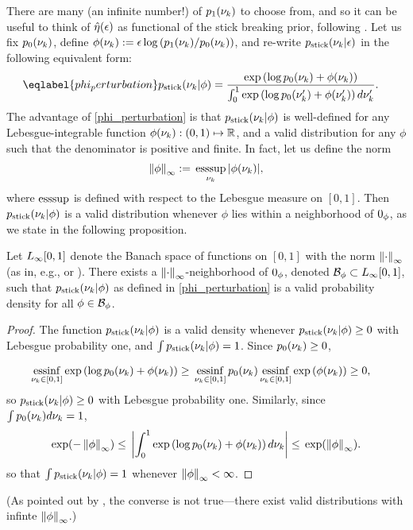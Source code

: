 There are many (an infinite number!) of $p_{1}(\nu_{k})$ to choose from, and so it
can be useful to think of $\hat\eta(\epsilon)$ as functional of the stick
breaking prior, following \citet{gustafson:1996:local}.  Let us fix $p_{0}(\nu_{k})$,
define $\phi(\nu_{k}) := \epsilon \log \left(p_{1}(\nu_{k}) / p_{0}(\nu_{k})\right)$, and
re-write $p_{\mathrm{stick}}(\nu_{k} \vert \epsilon)$ in the following equivalent form:
%
\begin{align}\eqlabel{phi_perturbation}
%
\pstick(\nuk \vert \phi) ={}&
\frac{\exp\left(\log \pb(\nuk) + \phi(\nuk)\right)}
     {\int_0^1 \exp\left(\log \pb(\nuk') + \phi(\nuk')\right) d\nuk'}.
%
\end{align}
%
The advantage of \eqref{phi_perturbation} is that $p_{\mathrm{stick}}(\nu_{k} \vert \phi)$ is
well-defined for any Lebesgue-integrable function $\phi(\nu_{k}):
(0,1)\mapsto\mathbb{R}$, and a valid distribution for any $\phi$ such that the
denominator is positive and finite.  In fact, let us define the norm
%
\begin{align*}
%
\norminf{\phi} :={} \esssup_{\nuk} |\phi(\nuk)|,
%
\end{align*}
%
where $\operatorname*{\mathrm{esssup}}$ is defined with respect to the Lebesgue measure on $[0,1]$.
Then $p_{\mathrm{stick}}(\nu_{k} \vert \phi)$ is a valid distribution whenever $\phi$ lies
within a neighborhood of $0_\phi$, as we state in the following proposition.

\begin{prop}
%
Let ${L_{\infty}[0,1]}$ denote the Banach space of functions on $[0,1]$ with the norm
$\left\Vert\cdot\right\Vert_{\infty}$ (as in, e.g., \citet[Section 2.1, Example
5]{luenberger:1997:optimization} or \citet[Theorem 5.2.1]{dudley:2018:real}).
There exists a $\left\Vert\cdot\right\Vert_{\infty}$-neighborhood of $0_\phi$, denoted $\mathcal{B}_\phi
\subset {L_{\infty}[0,1]}$, such that $p_{\mathrm{stick}}(\nu_{k} \vert \phi)$ as defined in
\eqref{phi_perturbation} is a valid probability density for all $\phi \in
\mathcal{B}_\phi$.
%
\begin{proof}
%
The function $p_{\mathrm{stick}}(\nu_{k} \vert \phi)$ is a valid density whenever
$p_{\mathrm{stick}}(\nu_{k} \vert \phi) \ge 0$ with Lebesgue probability one, and $\int
p_{\mathrm{stick}}(\nu_{k} \vert \phi) = 1$. Since $p_{0}(\nu_{k}) \ge 0$,

%
\begin{align*}
%
\essinf_{\nuk \in [0,1]} \exp\left(\log \pb(\nuk) + \phi(\nuk)\right)
    \ge{}&
\essinf_{\nuk \in [0,1]} \pb(\nuk)
\essinf_{\nuk \in [0,1]} \exp\left(\phi(\nuk)\right)
\ge{}0,
%
\end{align*}
%
so $p_{\mathrm{stick}}(\nu_{k} \vert \phi) \ge 0$ with Lebesgue probability one. Similarly,
since $\int p_{0}(\nu_{k}) d\nu_{k} = 1$,
%
\begin{align*}
%
\exp(-\norminf{\phi}) \le{}
\abs{\int_0^1 \exp\left(\log \pb(\nuk) + \phi(\nuk)\right) d\nuk}
\le{}
\exp(\norminf{\phi}).
%
\end{align*}
%
so that $\int p_{\mathrm{stick}}(\nu_{k} \vert \phi) = 1$ whenever $\left\Vert\phi\right\Vert_{\infty} < \infty$.
%
\end{proof}
%
\end{prop}
  (As pointed out by \citet{gustafson:1996:local}, the
converse is not true---there exist valid distributions with infinte
$\left\Vert\phi\right\Vert_{\infty}$.)

